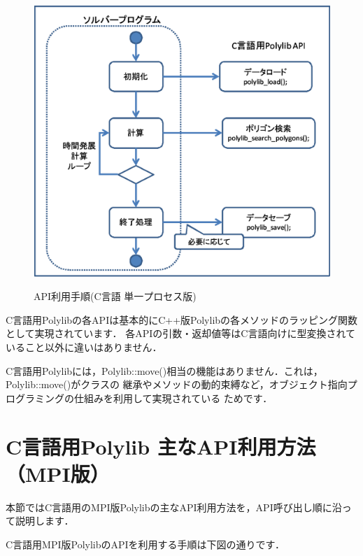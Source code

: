{\begin{figure}[H]
 \centering
 \includegraphics[width=12cm]{clip024.eps}\\
 \caption{API利用手順(C言語 単一プロセス版)}
\end{figure}

C言語用Polylibの各APIは基本的にC++版Polylibの各メソッドのラッピング関数として実現されています．
各APIの引数・返却値等はC言語向けに型変換されていること以外に違いはありません．

C言語用Polylibには，Polylib::move()相当の機能はありません．これは，Polylib::move()がクラスの
継承やメソッドの動的束縛など，オブジェクト指向プログラミングの仕組みを利用して実現されている
ためです．


\pagebreak

%
\section{C言語用Polylib 主なAPI利用方法（MPI版）}

本節ではC言語用のMPI版Polylibの主なAPI利用方法を，API呼び出し順に沿って説明します．

C言語用MPI版PolylibのAPIを利用する手順は下図の通りです．

}
